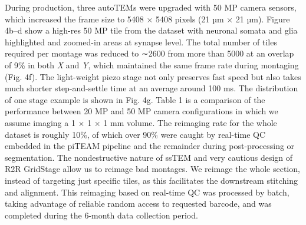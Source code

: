 \documentclass{article}
\begin{document}
During production, three autoTEMs were upgraded with 50 MP camera sensors, which increased the frame size to 5408 × 5408 pixels (21 µm × 21 µm). Figure 4b–d show a high-res 50 MP tile from the dataset with neuronal somata and glia highlighted and zoomed-in areas at synapse level. The total number of tiles required per montage was reduced to ∼2600 from more than 5000 at an overlap of 9\% in both \emph{X} and \emph{Y}, which maintained the same frame rate during montaging (Fig. 4f). The light-weight piezo stage not only preserves fast speed but also takes much shorter step-and-settle time at an average around 100 ms. The distribution of one stage example is shown in Fig. 4g. Table 1 is a comparison of the performance between 20 MP and 50 MP camera configurations in which we assume imaging a 1 × 1 × 1 mm volume. The reimaging rate for the whole dataset is roughly 10\%, of which over 90\% were caught by real-time QC embedded in the piTEAM pipeline and the remainder during post-processing or segmentation. The nondestructive nature of ssTEM and very cautious design of R2R GridStage allow us to reimage bad montages. We reimage the whole section, instead of targeting just specific tiles, as this facilitates the downstream stitching and alignment. This reimaging based on real-time QC was processed by batch, taking advantage of reliable random access to requested barcode, and was completed during the 6-month data collection period.
\end{document}
